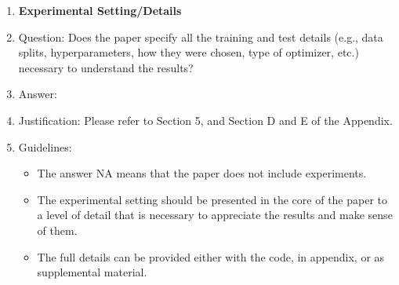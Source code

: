 \documentclass{article}
\begin{document}
\begin{enumerate}
\item {\bf Experimental Setting/Details}
    \item[] Question: Does the paper specify all the training and test details (e.g., data splits, hyperparameters, how they were chosen, type of optimizer, etc.) necessary to understand the results?
    \item[] Answer: \answerYes{} %
    \item[] Justification: Please refer to Section 5, and Section D and E of the Appendix.
    \item[] Guidelines:
    \begin{itemize}
        \item The answer NA means that the paper does not include experiments.
        \item The experimental setting should be presented in the core of the paper to a level of detail that is necessary to appreciate the results and make sense of them.
        \item The full details can be provided either with the code, in appendix, or as supplemental material.
    \end{itemize}


\end{enumerate}
\end{document}
